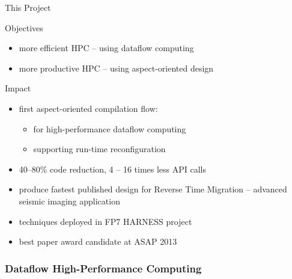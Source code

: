 \begin{frame}{This Project}
  \begin{beamerboxesrounded}{Objectives}
    \begin{itemize}
    \item more efficient HPC -- using dataflow computing
    \item more productive HPC -- using aspect-oriented design
    \end{itemize}
  \end{beamerboxesrounded}
  \vspace{0.3cm}
  \begin{beamerboxesrounded}{Impact}
    \begin{itemize}
      \item first aspect-oriented compilation flow:
      \begin{itemize}
      \item for high-performance dataflow computing
      \item supporting run-time reconfiguration
      \end{itemize}
    \item 40--80\% code reduction, 4 -- 16 times less API calls
    \item produce fastest published design for Reverse Time Migration
      -- advanced seismic imaging application
    \item techniques deployed in FP7 HARNESS project
    \item best paper award candidate at ASAP 2013
    \end{itemize}
  \end{beamerboxesrounded}
\end{frame}

\begin{frame}
  \frametitle{Dataflow High-Performance Computing}
  \begin{figure}[!ht]
    \centering
    \def\svgwidth{0.9\linewidth}
    
  \end{figure}
\end{frame}

